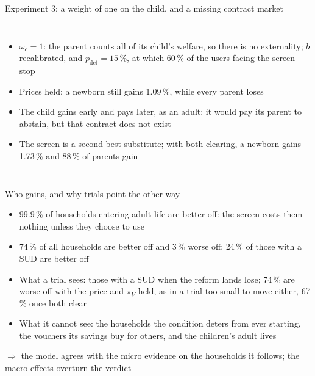 \documentclass[aspectratio=169,11pt]{beamer}
\newcommand{\pc}{\,\%}
\begin{document}
\begin{frame}{Experiment 3: a weight of one on the child, and a missing contract market}
\begin{columns}[T]
\centering\vspace{0.1cm}
\resizebox{\linewidth}{!}{}
\par{}
\footnotesize
\begin{itemize}\setlength\itemsep{0.3em}
\item $\omega_c=1$: the parent counts all of its child's welfare, so \alert{there is no externality}; $b$ recalibrated, and $p_{\text{det}}=15\pc$, at which 60\pc{} of the users facing the screen stop
\item Prices held: a newborn still gains 1.09\pc, while every parent loses
\item The child gains early and pays later, as an adult: it would pay its parent to abstain, but that contract does not exist
\item The screen is a \alert{second-best} substitute; with both clearing, a newborn gains 1.73\pc{} and 88\pc{} of parents gain
\end{itemize}
\end{columns}
\end{frame}

\begin{frame}{Who gains, and why trials point the other way}
\begin{itemize}\setlength\itemsep{0.5em}
\item 99.9\pc{} of households entering adult life are better off: the screen costs them nothing unless they choose to use
\item 74\pc{} of all households are better off and 3\pc{} worse off; 24\pc{} of those with a SUD are better off
\item What a trial sees: those with a SUD when the reform lands lose; 74\pc{} are worse off with the price and $\pi_V$ held, as in a trial too small to move either, 67\pc{} once both clear
\item What it cannot see: the households the condition deters from ever starting, the vouchers its savings buy for others, and the children's adult lives
\end{itemize}
\vspace{0.2cm}
$\Rightarrow$ the model agrees with the micro evidence on the households it follows; the macro effects overturn the verdict
\end{frame}
\end{document}
